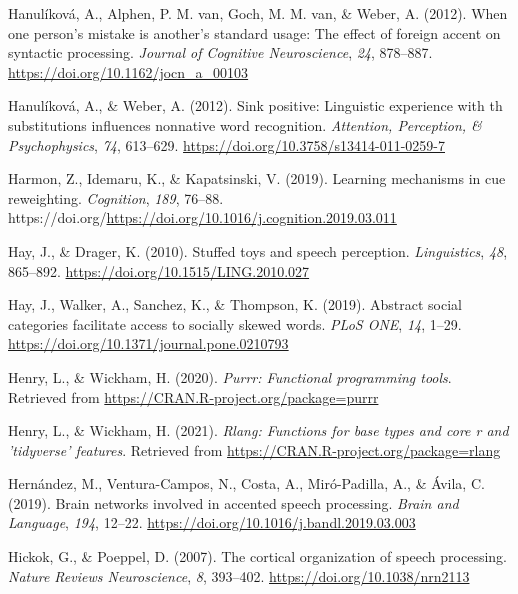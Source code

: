\documentclass[
  11pt,
  english,
  man,floatsintext]{apa6}
\newlength{\cslhangindent}
\newlength{\cslentryspacingunit} %
\newenvironment{CSLReferences}[2] %
 {%
  \setlength{\parindent}{0pt}
  \ifodd #1
  \let\oldpar\par
  \def\par{\hangindent=\cslhangindent\oldpar}
  \fi
  \setlength{\parskip}{#2\cslentryspacingunit}
 }%
 {}
\begin{document}
\begin{CSLReferences}{1}{0}
\leavevmode{}%
Hanulíková, A., Alphen, P. M. van, Goch, M. M. van, \& Weber, A. (2012). When one person's mistake is another's standard usage: The effect of foreign accent on syntactic processing. \emph{Journal of Cognitive Neuroscience}, \emph{24}, 878--887. \url{https://doi.org/10.1162/jocn_a_00103}

\leavevmode{}%
Hanulíková, A., \& Weber, A. (2012). Sink positive: Linguistic experience with th substitutions influences nonnative word recognition. \emph{Attention, Perception, \& Psychophysics}, \emph{74}, 613--629. \url{https://doi.org/10.3758/s13414-011-0259-7}

\leavevmode{}%
Harmon, Z., Idemaru, K., \& Kapatsinski, V. (2019). Learning mechanisms in cue reweighting. \emph{Cognition}, \emph{189}, 76--88. https://doi.org/\url{https://doi.org/10.1016/j.cognition.2019.03.011}

\leavevmode{}%
Hay, J., \& Drager, K. (2010). Stuffed toys and speech perception. \emph{Linguistics}, \emph{48}, 865--892. \url{https://doi.org/10.1515/LING.2010.027}

\leavevmode{}%
Hay, J., Walker, A., Sanchez, K., \& Thompson, K. (2019). Abstract social categories facilitate access to socially skewed words. \emph{PLoS ONE}, \emph{14}, 1--29. \url{https://doi.org/10.1371/journal.pone.0210793}

\leavevmode{}%
Henry, L., \& Wickham, H. (2020). \emph{Purrr: Functional programming tools}. Retrieved from \url{https://CRAN.R-project.org/package=purrr}

\leavevmode{}%
Henry, L., \& Wickham, H. (2021). \emph{Rlang: Functions for base types and core r and 'tidyverse' features}. Retrieved from \url{https://CRAN.R-project.org/package=rlang}

\leavevmode{}%
Hernández, M., Ventura-Campos, N., Costa, A., Miró-Padilla, A., \& Ávila, C. (2019). Brain networks involved in accented speech processing. \emph{Brain and Language}, \emph{194}, 12--22. \url{https://doi.org/10.1016/j.bandl.2019.03.003}

\leavevmode{}%
Hickok, G., \& Poeppel, D. (2007). The cortical organization of speech processing. \emph{Nature Reviews Neuroscience}, \emph{8}, 393--402. \url{https://doi.org/10.1038/nrn2113}


\end{CSLReferences}
\end{document}
